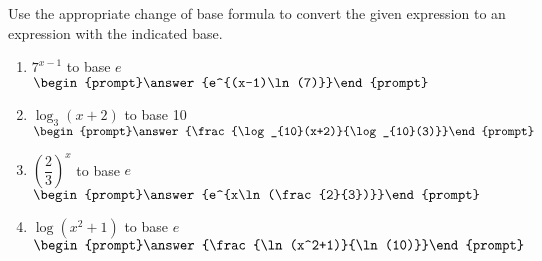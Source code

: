 \documentclass{ximera}
\author{Carl Stitz \and Jeff Zeager \and Bart Snapp \and Matthew Carr}
\begin{document}
\begin{exercise}





Use the appropriate change of base formula to convert the given
expression to an expression with the indicated base.

\begin{enumerate}
\item $7^{x - 1}$ to base $e$\\ $\begin{prompt}\answer{e^{(x-1)\ln(7)}}\end{prompt}$ \label{changeofbasefirst}
\item $\log_{3}(x + 2)$ to base 10\\ $\begin{prompt}\answer{\frac{\log_{10}(x+2)}{\log_{10}(3)}}\end{prompt}$
\item $\left(\dfrac{2}{3}\right)^{x}$ to base $e$\\ $\begin{prompt}\answer{e^{x\ln(\frac{2}{3})}}\end{prompt}$
\item $\log(x^{2} + 1)$ to base $e$ \\ $\begin{prompt}\answer{\frac{\ln(x^2+1)}{\ln(10)}}\end{prompt}$ \label{changeofbaselast}
\end{enumerate}

\end{exercise}
\end{document}
